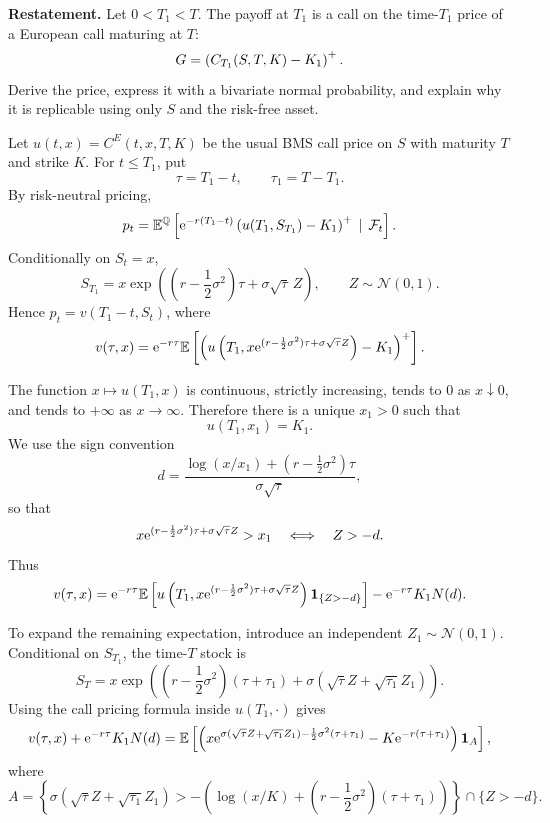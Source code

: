 \begin{exercise}
\textbf{Restatement.}
Let \(0<T_1<T\).  The payoff at \(T_1\) is a call on the time-\(T_1\) price of a
European call maturing at \(T\):
\[
  G=\left(C_{T_1}(S,T,K)-K_1\right)^+.
\]
Derive the price, express it with a bivariate normal probability, and explain
why it is replicable using only \(S\) and the risk-free asset.

\begin{solution}
Let \(u(t,x)=C^E(t,x,T,K)\) be the usual BMS call price on \(S\) with maturity
\(T\) and strike \(K\).  For \(t\le T_1\), put
\[
  \tau=T_1-t,\qquad \tau_1=T-T_1.
\]
By risk-neutral pricing,
\[
  p_t
    =\mathbb{E}^{\mathbb{Q}}\left[\mathrm{e}^{-r(T_1-t)}\left(u(T_1,S_{T_1})-K_1\right)^+\,\mid\,\mathcal{F}_t\right].
\]
Conditionally on \(S_t=x\),
\[
  S_{T_1}
    =x\exp\left(\left(r-\frac12\sigma^2\right)\tau
       +\sigma\sqrt{\tau}\,Z\right),
  \qquad Z\sim\mathcal N(0,1).
\]
Hence \(p_t=v(T_1-t,S_t)\), where
\[
  v(\tau,x)
    =\mathrm{e}^{-r\tau}\mathbb{E}\left[
       \left(
         u\left(T_1,
           x\mathrm{e}^{(r-\frac12\sigma^2)\tau+\sigma\sqrt{\tau}Z}
         \right)-K_1
       \right)^+
     \right].
\]

The function \(x\mapsto u(T_1,x)\) is continuous, strictly increasing, tends to
\(0\) as \(x\downarrow0\), and tends to \(+\infty\) as \(x\to\infty\).  Therefore
there is a unique \(x_1>0\) such that
\[
  u(T_1,x_1)=K_1.
\]
We use the sign convention
\[
  d=\frac{\log(x/x_1)+(r-\frac12\sigma^2)\tau}{\sigma\sqrt{\tau}},
\]
so that
\[
  x\mathrm{e}^{(r-\frac12\sigma^2)\tau+\sigma\sqrt{\tau}Z}>x_1
  \quad\Longleftrightarrow\quad Z>-d.
\]
Thus
\[
  v(\tau,x)
  =
  \mathrm{e}^{-r\tau}
  \mathbb{E}\left[
    u\left(T_1,x\mathrm{e}^{(r-\frac12\sigma^2)\tau+\sigma\sqrt{\tau}Z}\right)
    \mathbf{1}_{\{Z>-d\}}
  \right]
  -\mathrm{e}^{-r\tau}K_1N(d).
\]

To expand the remaining expectation, introduce an independent
\(Z_1\sim\mathcal N(0,1)\).  Conditional on \(S_{T_1}\), the time-\(T\) stock is
\[
  S_T
  =
  x\exp\left(
    \left(r-\frac12\sigma^2\right)(\tau+\tau_1)
    +\sigma(\sqrt{\tau}Z+\sqrt{\tau_1}Z_1)
  \right).
\]
Using the call pricing formula inside \(u(T_1,\cdot)\) gives
\[
  v(\tau,x)+\mathrm{e}^{-r\tau}K_1N(d)
  =
  \mathbb{E}\left[
    \left(
      x\mathrm{e}^{\sigma(\sqrt{\tau}Z+\sqrt{\tau_1}Z_1)
        -\frac12\sigma^2(\tau+\tau_1)}
      -K\mathrm{e}^{-r(\tau+\tau_1)}
    \right)\mathbf{1}_A
  \right],
\]
where
\[
  A=
  \left\{
    \sigma(\sqrt{\tau}Z+\sqrt{\tau_1}Z_1)
    >
    -\left(\log(x/K)+\left(r-\frac12\sigma^2\right)(\tau+\tau_1)\right)
  \right\}
  \cap\{Z>-d\}.
\]


\end{solution}
\end{exercise}
